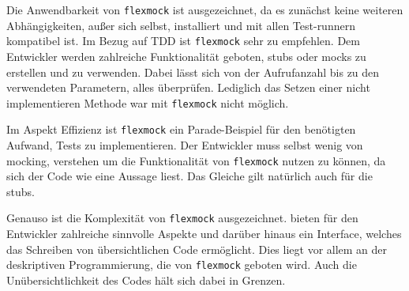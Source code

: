 Die Anwendbarkeit von \lstinline{flexmock} ist ausgezeichnet, da es zunächst
keine weiteren Abhängigkeiten, außer sich selbst, installiert und mit allen
Test-runnern kompatibel ist. Im Bezug auf TDD ist \lstinline{flexmock} sehr zu
empfehlen. Dem Entwickler werden zahlreiche Funktionalität geboten,
\Glspl{stub} oder \Glspl{mock} zu erstellen und zu verwenden. Dabei lässt sich
von der Aufrufanzahl bis zu den verwendeten Parametern, alles überprüfen.
Lediglich das Setzen einer nicht implementieren Methode war mit
\lstinline{flexmock} nicht möglich.

Im Aspekt Effizienz ist \lstinline{flexmock} ein Parade-Beispiel für den 
benötigten Aufwand, Tests zu implementieren. Der Entwickler muss selbst wenig
von \gls{mock}ing, verstehen um die Funktionalität von \lstinline{flexmock}
nutzen zu können, da sich der Code wie eine Aussage liest. Das Gleiche gilt
natürlich auch für die \Glspl{stub}.

Genauso ist die Komplexität von \lstinline{flexmock} ausgezeichnet.
 bieten für den Entwickler zahlreiche sinnvolle Aspekte und
darüber hinaus  ein Interface, welches das Schreiben von übersichtlichen Code
ermöglicht. Dies liegt vor allem an der deskriptiven Programmierung, die von
\lstinline{flexmock} geboten wird. Auch die Unübersichtlichkeit des Codes hält 
sich dabei in Grenzen.